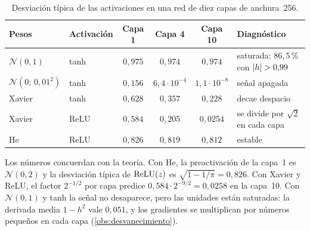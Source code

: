 \begin{table}[h]
\centering\small
\caption{Desviación típica de las activaciones en una red de diez capas de anchura~256.}\label{tab:experimento}
\begin{tabular}{@{}llcccl@{}}
\toprule
Pesos & Activación & Capa 1 & Capa 4 & Capa 10 & Diagnóstico \\
\midrule
$\mathcal{N}(0,1)$ & tanh & $0{,}975$ & $0{,}974$ & $0{,}974$ & saturada: $86{,}5\,\%$ con $\lvert h\rvert>0{,}99$ \\
$\mathcal{N}(0;\,0{,}01^{2})$ & tanh & $0{,}156$ & $6{,}4\cdot 10^{-4}$ & $1{,}1\cdot 10^{-8}$ & señal apagada \\
Xavier & tanh & $0{,}628$ & $0{,}357$ & $0{,}228$ & decae despacio \\
Xavier & ReLU & $0{,}584$ & $0{,}205$ & $0{,}0254$ & se divide por $\sqrt2$ en cada capa \\
He & ReLU & $0{,}826$ & $0{,}819$ & $0{,}812$ & estable \\
\bottomrule
\end{tabular}
\end{table}

Los números concuerdan con la teoría. Con He, la preactivación de la capa~1 es $\mathcal{N}(0,2)$ y la desviación típica de $\operatorname{ReLU}(z)$ es $\sqrt{1-1/\pi}=0{,}826$. Con Xavier y ReLU, el factor $2^{-1/2}$ por capa predice $0{,}584\cdot 2^{-9/2}=0{,}0258$ en la capa~10. Con $\mathcal{N}(0,1)$ y tanh la señal no desaparece, pero las unidades están saturadas: la derivada media $1-h^{2}$ vale $0{,}051$, y los gradientes se multiplican por números pequeños en cada capa (\cref{obs:desvanecimiento}).

\addtocounter{definicion}{1}%

